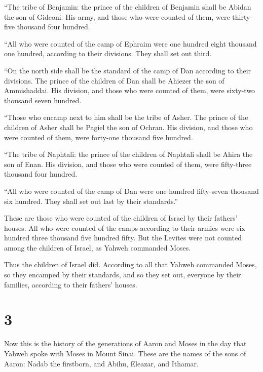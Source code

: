  ``The tribe of Benjamin: the prince of the children of
Benjamin shall be Abidan the son of Gideoni.  His army,
and those who were counted of them, were thirty-five thousand four
hundred.

 ``All who were counted of the camp of Ephraim were one
hundred eight thousand one hundred, according to their divisions. They
shall set out third.

 ``On the north side shall be the standard of the camp of
Dan according to their divisions. The prince of the children of Dan
shall be Ahiezer the son of Ammishaddai.  His division,
and those who were counted of them, were sixty-two thousand seven
hundred.

 ``Those who encamp next to him shall be the tribe of
Asher. The prince of the children of Asher shall be Pagiel the son of
Ochran.  His division, and those who were counted of
them, were forty-one thousand five hundred.

 ``The tribe of Naphtali: the prince of the children of
Naphtali shall be Ahira the son of Enan.  His division,
and those who were counted of them, were fifty-three thousand four
hundred.

 ``All who were counted of the camp of Dan were one
hundred fifty-seven thousand six hundred. They shall set out last by
their standards.''

 These are those who were counted of the children of
Israel by their fathers' houses. All who were counted of the camps
according to their armies were six hundred three thousand five hundred
fifty.  But the Levites were not counted among the
children of Israel, as Yahweh commanded Moses.

 Thus the children of Israel did. According to all that
Yahweh commanded Moses, so they encamped by their standards, and so they
set out, everyone by their families, according to their fathers' houses.

\hypertarget{section-2}{%
\section{3}\label{section-2}}

 Now this is the history of the generations of Aaron and
Moses in the day that Yahweh spoke with Moses in Mount Sinai.
 These are the names of the sons of Aaron: Nadab the
firstborn, and Abihu, Eleazar, and Ithamar.

